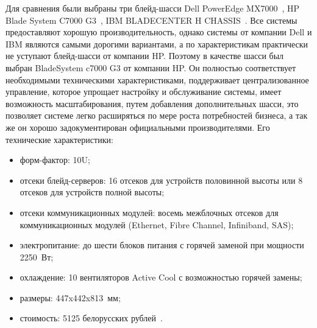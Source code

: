 Для сравнения были выбраны три блейд-шасси Dell PowerEdge MX7000~\cite{poweredge-mx7000-dell}, HP Blade System C7000 G3~\cite{shassi-hp-c7000-g3-enclosure}, IBM BLADECENTER H CHASSIS~\cite{bladecenter_chassis_h}. Все системы предоставляют хорошую производительность, однако системы от компании Dell и IBM являются самыми дорогими вариантами, а по характеристикам практически не уступают блейд-шасси от компании HP. Поэтому в качестве шасси был выбран BladeSystem c7000 G3 от компании HP. Он полностью соответствует необходимыми техническими характеристиками, поддерживает централизованное управление, которое упрощает настройку и обслуживание системы, имеет возможность масштабирования, путем добавления дополнительных шасси, это позволяет системе легко расширяться по мере роста потребностей бизнеса, а так же он хорошо задокументирован официальными производителями. Его технические характеристики:

\begin{itemize}
    \item форм-фактор: 10U;
    \item отсеки блейд-серверов: 16 отсеков для устройств половинной высоты или 8 отсеков для устройств полной высоты;
    \item отсеки коммуникационных модулей: восемь межблочных отсеков для коммуникационных модулей (Ethernet, Fibre Channel, Infiniband, SAS);
    \item электропитание: до шести блоков питания с горячей заменой при мощности 2250~Вт;
    \item охлаждение: 10 вентиляторов Active Cool с возможностью горячей замены;
    \item размеры: 447x442x813~мм;
    \item стоимость: 5125 белорусских рублей~\cite{shassi-hp-c7000-g3-enclosure}.
\end{itemize}


        
